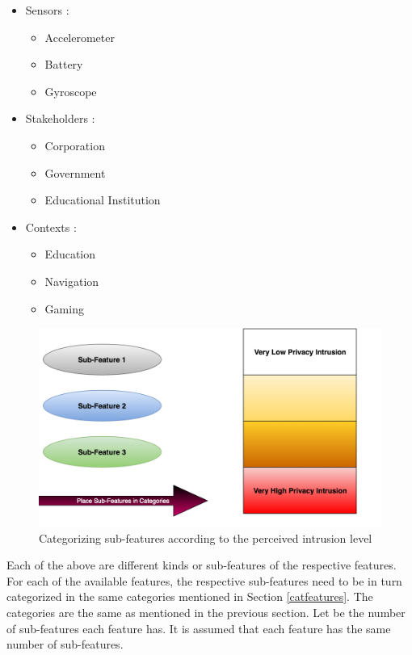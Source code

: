 \begin{itemize}
\item Sensors : 
\begin{itemize}
\item Accelerometer
\item  Battery
\item Gyroscope
\end{itemize} 
\item Stakeholders : 
\begin{itemize}
\item Corporation
\item  Government
\item Educational Institution
\end{itemize}
\item Contexts :
\begin{itemize}
\item Education
\item Navigation
\item Gaming
\end{itemize}
\end{itemize}

\begin{figure}[ht!]
\centering
\includegraphics[width=\textwidth,keepaspectratio]{./images/categorize_sub}
\caption{Categorizing sub-features according to the perceived intrusion level \label{categorize_sub}}
\end{figure}

Each of the above are different kinds or sub-features of the respective features. 
For each of the available features, the respective sub-features need to be in turn categorized in the same categories mentioned in Section \ref{catfeatures}. The categories are the same as mentioned in the previous section. Let \numsubfeatures be the number of sub-features each feature has. It is assumed that each feature has the same number of sub-features.

